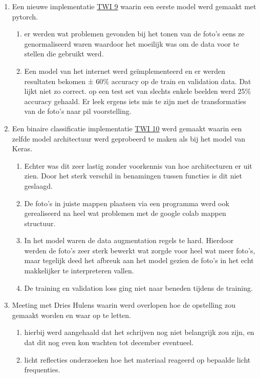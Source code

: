 \documentclass{scrartcl}
\begin{document}
\begin{enumerate}[1]
\item Een nieuwe implementatie \href{https://colab.research.google.com/drive/1f-Rfei8QrHotvgktp8hzviR8dv1XJJjz}{TWI 9} waarin een eerste model werd gemaakt met pytorch. 
	\begin{enumerate}[a]
	\item er werden wat problemen gevonden bij het tonen van de foto's eens ze genormaliseerd waren waardoor het moeilijk was om de data voor te stellen die gebruikt werd. 
	\item Een model van het internet werd geïmplementeerd en er werden resultaten bekomen ± 60\% accuracy op de train en validation data. Dat lijkt niet zo correct. op een test set van slechts enkele beelden werd 25\% accuracy gehaald. Er leek ergens iets mis te zijn met de transformaties van de foto's naar pil voorstelling. 
	\end{enumerate}
\item Een binaire classificatie implementatie \href{https://colab.research.google.com/drive/1t4Yvzj1rqNy24pj4dDtyBH2CStDePXMw}{TWI 10} werd gemaakt waarin een zelfde model architectuur werd geprobeerd te maken als bij het model van Keras. 
	\begin{enumerate}[a]
	\item Echter was dit zeer lastig zonder voorkennis van hoe architecturen er uit zien. Door het sterk verschil in benamingen tussen functies is dit niet geslaagd. 
	\item De foto's in juiste mappen plaatsen via een programma werd ook gerealiseerd na heel wat problemen met de google colab mappen structuur. 
	\item In het model waren de data augmentation regels te hard. Hierdoor werden de foto's zeer sterk bewerkt wat zorgde voor heel wat meer foto's, maar tegelijk deed het afbreuk aan het model gezien de foto's in het echt makkelijker te interpreteren vallen. 
	\item De training en validation loss ging niet naar beneden tijdens de training.
	\end{enumerate}
\item Meeting met Dries Hulens waarin werd overlopen hoe de opstelling zou gemaakt worden en waar op te letten.
	\begin{enumerate}[a]
	\item hierbij werd aangehaald dat het schrijven nog niet belangrijk zou zijn, en dat dit nog even kon wachten tot december eventueel.
	\item licht reflecties onderzoeken hoe het materiaal reageerd op bepaalde licht frequenties.

\end{enumerate}
\end{enumerate}
\end{document}
